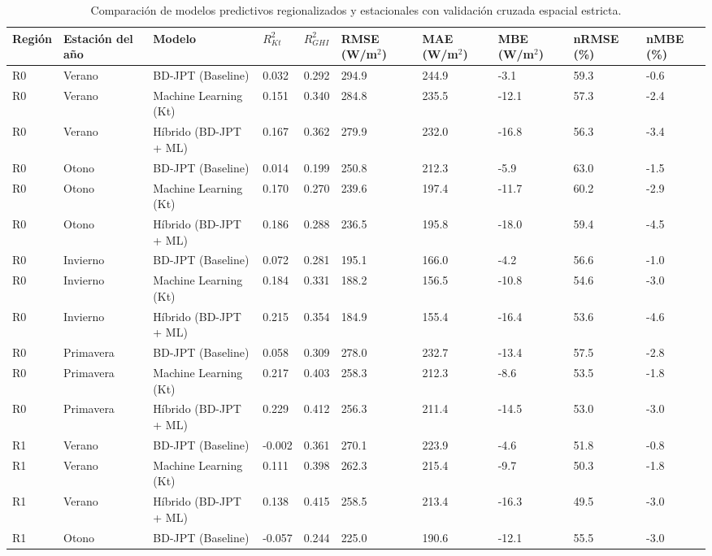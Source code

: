 \begin{table}[htpb]
\centering
\small
\caption{Comparación de modelos predictivos regionalizados y estacionales con validación cruzada espacial estricta.}
\label{tab:bdjpt_regional_estacional_models}
\begin{tabular}{llllllllll}
\toprule
Región & Estación del año & Modelo & $R^2_{Kt}$ & $R^2_{GHI}$ & RMSE (W/m$^2$) & MAE (W/m$^2$) & MBE (W/m$^2$) & nRMSE (\%) & nMBE (\%) \\
\midrule
R0 & Verano & BD-JPT (Baseline) & 0.032 & 0.292 & 294.9 & 244.9 & -3.1 & 59.3 & -0.6 \\
R0 & Verano & Machine Learning (Kt) & 0.151 & 0.340 & 284.8 & 235.5 & -12.1 & 57.3 & -2.4 \\
R0 & Verano & Híbrido (BD-JPT + ML) & 0.167 & 0.362 & 279.9 & 232.0 & -16.8 & 56.3 & -3.4 \\
R0 & Otono & BD-JPT (Baseline) & 0.014 & 0.199 & 250.8 & 212.3 & -5.9 & 63.0 & -1.5 \\
R0 & Otono & Machine Learning (Kt) & 0.170 & 0.270 & 239.6 & 197.4 & -11.7 & 60.2 & -2.9 \\
R0 & Otono & Híbrido (BD-JPT + ML) & 0.186 & 0.288 & 236.5 & 195.8 & -18.0 & 59.4 & -4.5 \\
R0 & Invierno & BD-JPT (Baseline) & 0.072 & 0.281 & 195.1 & 166.0 & -4.2 & 56.6 & -1.0 \\
R0 & Invierno & Machine Learning (Kt) & 0.184 & 0.331 & 188.2 & 156.5 & -10.8 & 54.6 & -3.0 \\
R0 & Invierno & Híbrido (BD-JPT + ML) & 0.215 & 0.354 & 184.9 & 155.4 & -16.4 & 53.6 & -4.6 \\
R0 & Primavera & BD-JPT (Baseline) & 0.058 & 0.309 & 278.0 & 232.7 & -13.4 & 57.5 & -2.8 \\
R0 & Primavera & Machine Learning (Kt) & 0.217 & 0.403 & 258.3 & 212.3 & -8.6 & 53.5 & -1.8 \\
R0 & Primavera & Híbrido (BD-JPT + ML) & 0.229 & 0.412 & 256.3 & 211.4 & -14.5 & 53.0 & -3.0 \\
R1 & Verano & BD-JPT (Baseline) & -0.002 & 0.361 & 270.1 & 223.9 & -4.6 & 51.8 & -0.8 \\
R1 & Verano & Machine Learning (Kt) & 0.111 & 0.398 & 262.3 & 215.4 & -9.7 & 50.3 & -1.8 \\
R1 & Verano & Híbrido (BD-JPT + ML) & 0.138 & 0.415 & 258.5 & 213.4 & -16.3 & 49.5 & -3.0 \\
R1 & Otono & BD-JPT (Baseline) & -0.057 & 0.244 & 225.0 & 190.6 & -12.1 & 55.5 & -3.0 \\

\end{tabular}
\end{table}
